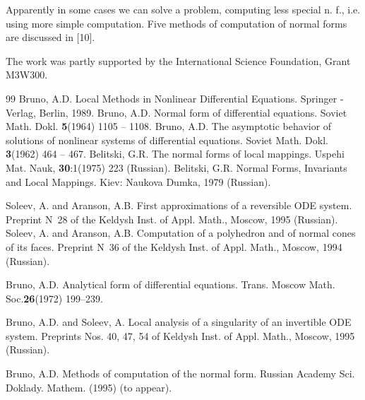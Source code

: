  Apparently in some cases we can solve a problem, computing less
 special n. f., i.e. using more simple computation. Five methods of
 computation of normal forms are discussed in [10].

 The work was partly supported by the  International Science
 Foundation, Grant M3W300.


\begin{thebibliography}{99}
    Bruno, A.D. Local Methods in Nonlinear Differential Equations.
   Springer -Verlag, Berlin, 1989.
   Bruno,  A.D. Normal form of differential equations.
   Soviet Math. Dokl. {\bf 5}(1964) 1105 -- 1108.
   Bruno,  A.D. The asymptotic behavior of solutions of nonlinear
   systems of differential equations.
   Soviet Math. Dokl. {\bf 3}(1962) 464 -- 467.
    Belitski, G.R. The normal forms of local mappings. Uspehi Mat.
    Nauk, {\bf 30}:1(1975) 223 (Russian).
    Belitski, G.R. Normal Forms, Invariants and Local Mappings.
    Kiev: Naukova Dumka, 1979 (Russian).

 Soleev, A. and Aranson, A.B. First approximations of a reversible ODE
  system. Preprint N~28 of the Keldysh Inst. of Appl. Math., Moscow, 1995
 (Russian).
 Soleev, A. and Aranson, A.B. Computation of a polyhedron and of
 normal cones of its faces. Preprint N~36 of the Keldysh Inst. of
 Appl. Math., Moscow, 1994 (Russian).

   Bruno, A.D. Analytical form of differential equations. Trans. Moscow
   Math. Soc.{\bf 26}(1972) 199--239.

  Bruno, A.D. and  Soleev, A.  Local analysis of a singularity of an
  invertible ODE system. Preprints Nos. 40, 47, 54 of Keldysh Inst. of
  Appl. Math., Moscow, 1995 (Russian).

   Bruno, A.D. Methods of computation of the normal form. Russian
   Academy Sci. Doklady. Mathem. (1995) (to appear).
\end{thebibliography}


